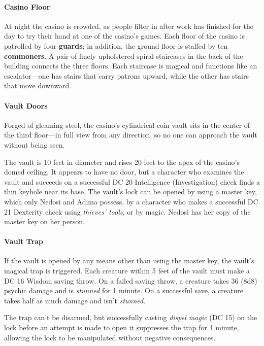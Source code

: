 \documentclass[a4paper, 11pt, bg=full, twocolumn, nooutline]{dndbook}
\begin{document}
\paragraph{Casino Floor}

At night the casino is crowded, as people filter in after work has finished for the day to try their hand at one of the casino's games. Each floor of the casino is patrolled by four \textbf{guards}; in addition, the ground floor is staffed by ten \textbf{commoners}. A pair of finely upholstered spiral staircases in the back of the building connects the three floors. Each staircase is magical and functions like an escalator---one has stairs that carry patrons upward, while the other has stairs that move downward.

\paragraph{Vault Doors}

Forged of gleaming steel, the casino's cylindrical coin vault sits in the center of the third floor---in full view from any direction, so no one can approach the vault without being seen.

The vault is 10 feet in diameter and rises 20 feet to the apex of the casino's domed ceiling. It appears to have no door, but a character who examines the vault and succeeds on a successful DC 20 Intelligence (Investigation) check finds a thin keyhole near its base. The vault's lock can be opened by using a master key, which only Nedosi and Adima possess, by a character who makes a successful DC 21 Dexterity check using \textit{thieves' tools}, or by magic. Nedosi has her copy of the master key on her person.

\paragraph{Vault Trap}

If the vault is opened by any means other than using the master key, the vault's magical trap is triggered. Each creature within 5 feet of the vault must make a DC 16 Wisdom saving throw. On a failed saving throw, a creature takes 36 (8d8) psychic damage and is \textit{stunned} for 1 minute. On a successful save, a creature takes half as much damage and isn't \textit{stunned}.

The trap can't be disarmed, but successfully casting \textit{dispel magic} (DC 15) on the lock before an attempt is made to open it suppresses the trap for 1 minute, allowing the lock to be manipulated without negative consequences.
\end{document}
